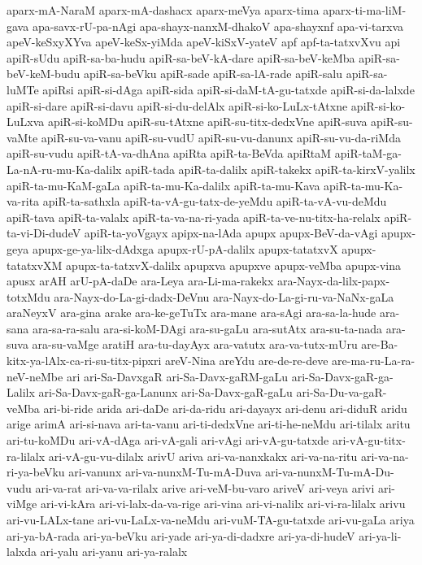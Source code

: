 {aparx-mA-NaraM
aparx-mA-dashacx
aparx-meVya
aparx-tima
aparx-ti-ma-liM-gava
apa-savx-rU-pa-nAgi
apa-shayx-nanxM-dhakoV
apa-shayxnf
apa-vi-tarxva
apeV-keSxyXYva
apeV-keSx-yiMda
apeV-kiSxV-yateV
apf
apf-ta-tatxvXvu
api
apiR-sUdu
apiR-sa-ba-hudu
apiR-sa-beV-kA-dare
apiR-sa-beV-keMba
apiR-sa-beV-keM-budu
apiR-sa-beVku
apiR-sade
apiR-sa-lA-rade
apiR-salu
apiR-sa-luMTe
apiRsi
apiR-si-dAga
apiR-sida
apiR-si-daM-tA-gu-tatxde
apiR-si-da-lalxde
apiR-si-dare
apiR-si-davu
apiR-si-du-delAlx
apiR-si-ko-LuLx-tAtxne
apiR-si-ko-LuLxva
apiR-si-koMDu
apiR-su-tAtxne
apiR-su-titx-dedxVne
apiR-suva
apiR-su-vaMte
apiR-su-va-vanu
apiR-su-vudU
apiR-su-vu-danunx
apiR-su-vu-da-riMda
apiR-su-vudu
apiR-tA-va-dhAna
apiRta
apiR-ta-BeVda
apiRtaM
apiR-taM-ga-La-nA-ru-mu-Ka-dalilx
apiR-tada
apiR-ta-dalilx
apiR-takekx
apiR-ta-kirxV-yalilx
apiR-ta-mu-KaM-gaLa
apiR-ta-mu-Ka-dalilx
apiR-ta-mu-Kava
apiR-ta-mu-Ka-va-rita
apiR-ta-sathxla
apiR-ta-vA-gu-tatx-de-yeMdu
apiR-ta-vA-vu-deMdu
apiR-tava
apiR-ta-valalx
apiR-ta-va-na-ri-yada
apiR-ta-ve-nu-titx-ha-relalx
apiR-ta-vi-Di-dudeV
apiR-ta-yoVgayx
apipx-na-lAda
apupx
apupx-BeV-da-vAgi
apupx-geya
apupx-ge-ya-lilx-dAdxga
apupx-rU-pA-dalilx
apupx-tatatxvX
apupx-tatatxvXM
apupx-ta-tatxvX-dalilx
apupxva
apupxve
apupx-veMba
apupx-vina
apusx
arAH
arU-pA-daDe
ara-Leya
ara-Li-ma-rakekx
ara-Nayx-da-lilx-papx-totxMdu
ara-Nayx-do-La-gi-dadx-DeVnu
ara-Nayx-do-La-gi-ru-va-NaNx-gaLa
araNeyxV
ara-gina
arake
ara-ke-geTuTx
ara-mane
ara-sAgi
ara-sa-la-hude
ara-sana
ara-sa-ra-salu
ara-si-koM-DAgi
ara-su-gaLu
ara-sutAtx
ara-su-ta-nada
ara-suva
ara-su-vaMge
aratiH
ara-tu-dayAyx
ara-vatutx
ara-va-tutx-mUru
are-Ba-kitx-ya-lAlx-ca-ri-su-titx-pipxri
areV-Nina
areYdu
are-de-re-deve
are-ma-ru-La-ra-neV-neMbe
ari
ari-Sa-DavxgaR
ari-Sa-Davx-gaRM-gaLu
ari-Sa-Davx-gaR-ga-Lalilx
ari-Sa-Davx-gaR-ga-Lanunx
ari-Sa-Davx-gaR-gaLu
ari-Sa-Du-va-gaR-veMba
ari-bi-ride
arida
ari-daDe
ari-da-ridu
ari-dayayx
ari-denu
ari-diduR
aridu
arige
arimA
ari-si-nava
ari-ta-vanu
ari-ti-dedxVne
ari-ti-he-neMdu
ari-tilalx
aritu
ari-tu-koMDu
ari-vA-dAga
ari-vA-gali
ari-vAgi
ari-vA-gu-tatxde
ari-vA-gu-titx-ra-lilalx
ari-vA-gu-vu-dilalx
arivU
ariva
ari-va-nanxkakx
ari-va-na-ritu
ari-va-na-ri-ya-beVku
ari-vanunx
ari-va-nunxM-Tu-mA-Duva
ari-va-nunxM-Tu-mA-Du-vudu
ari-va-rat
ari-va-va-rilalx
arive
ari-veM-bu-varo
ariveV
ari-veya
arivi
ari-viMge
ari-vi-kAra
ari-vi-lalx-da-va-rige
ari-vina
ari-vi-nalilx
ari-vi-ra-lilalx
arivu
ari-vu-LALx-tane
ari-vu-LaLx-va-neMdu
ari-vuM-TA-gu-tatxde
ari-vu-gaLa
ariya
ari-ya-bA-rada
ari-ya-beVku
ari-yade
ari-ya-di-dadxre
ari-ya-di-hudeV
ari-ya-li-lalxda
ari-yalu
ari-yanu
ari-ya-ralalx
}
